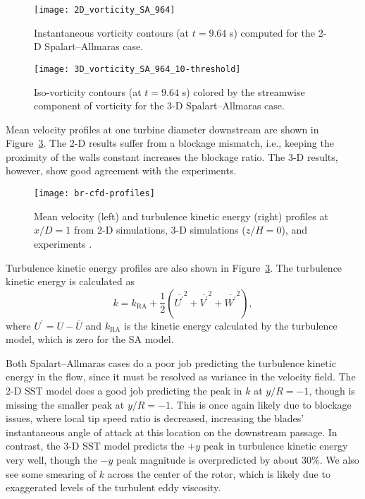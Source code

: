 \begin{figure}
    \centering
    
    \texttt{[image: 2D\_vorticity\_SA\_964]}

    \caption{Instantaneous vorticity contours (at $t=9.64$ s) computed for the
        2-D Spalart--Allmaras case.}

    \label{fig:br-vorticity-2d}
\end{figure}

\begin{figure}
    \centering

    \texttt{[image: 3D\_vorticity\_SA\_964\_10-threshold]}

    \caption{Iso-vorticity contours (at $t=9.64$ s) colored by the streamwise
        component of vorticity for the 3-D Spalart--Allmaras case.}

    \label{fig:br-vorticity-3d}
\end{figure}

Mean velocity profiles at one turbine diameter downstream are shown in
Figure~\ref{fig:br-cfd-profiles}. The 2-D results suffer from a blockage
mismatch, i.e., keeping the proximity of the walls constant increases the
blockage ratio. The 3-D results, however, show good agreement with the
experiments.

\begin{figure}
    \centering

    \texttt{[image: br-cfd-profiles]}

    \caption{Mean velocity (left) and turbulence kinetic energy (right) profiles
        at $x/D=1$ from 2-D simulations, 3-D simulations ($z/H=0$), and experiments
        \cite{Bachant2015-JoT}.}

    \label{fig:br-cfd-profiles}
\end{figure}

Turbulence kinetic energy profiles are also shown in
Figure~\ref{fig:br-cfd-profiles}. The turbulence kinetic energy is calculated as
\begin{equation}
    k = k_{\mathrm{RA}} + \frac{1}{2} \left(
    \overline{U^\prime}^2 +
    \overline{V^\prime}^2 +
    \overline{W^\prime}^2 \right),
    \label{eq:k}
\end{equation}
where $U^\prime = U - \overline{U}$ and $k_{\mathrm{RA}}$ is the kinetic energy
calculated by the turbulence model, which is zero for the SA model.

Both Spalart--Allmaras cases do a poor job predicting the turbulence kinetic
energy in the flow, since it must be resolved as variance in the velocity field.
The 2-D SST model does a good job predicting the peak in $k$ at $y/R=-1$, though
is missing the smaller peak at $y/R=-1$. This is once again likely due to
blockage issues, where local tip speed ratio is decreased, increasing the
blades' instantaneous angle of attack at this location on the downstream
passage. In contrast, the 3-D SST model predicts the $+y$ peak in turbulence
kinetic energy very well, though the $-y$ peak magnitude is overpredicted by
about 30\%. We also see some smearing of $k$ across the center of the rotor,
which is likely due to exaggerated levels of the turbulent eddy viscosity.



